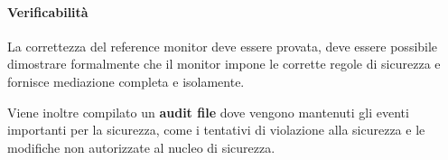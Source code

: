 \paragraph{Verificabilità} La correttezza del reference monitor deve essere provata, deve essere possibile dimostrare formalmente che il monitor impone le corrette regole di sicurezza e fornisce mediazione completa e isolamente.

Viene inoltre compilato un \textbf{audit file} dove vengono mantenuti gli eventi importanti per la sicurezza, come i tentativi di violazione alla sicurezza e le modifiche non autorizzate al nucleo di sicurezza.
















